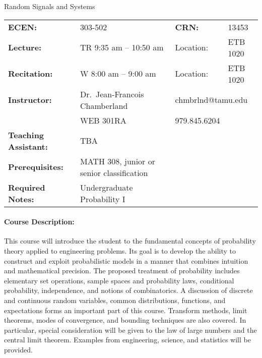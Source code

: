 \documentclass{article}
\begin{document}
\begin{center}
{\LARGE \sc Random Signals and Systems \\[5mm]}
\end{center}

\begin{center}
\begin{tabular}{llll}
\textbf{ECEN:} & 303-502 & \textbf{CRN:} & 13453 \tabularnewline[1mm]
\textbf{Lecture:} & TR 9:35 am -- 10:50 am & {Location:} & ETB 1020\tabularnewline[1mm]
\textbf{Recitation:} & W 8:00 am -- 9:00 am & {Location:} & ETB 1020 \tabularnewline[1mm]
\textbf{Instructor:} & Dr.~Jean-Francois Chamberland & \multicolumn{2}{l}{chmbrlnd@tamu.edu} \tabularnewline[1mm]
& WEB 301RA & 979.845.6204 \tabularnewline[1mm]
\textbf{Teaching Assistant:} & TBA & & \tabularnewline[1mm]
\textbf{Prerequisites:} & {MATH 308, junior or senior classification} \tabularnewline[1mm]
\textbf{Required Notes:} & {Undergraduate Probability I} \tabularnewline[1mm]
\end{tabular}
\end{center}

\paragraph{Course Description:}
This course will introduce the student to the fundamental concepts of probability theory applied to engineering problems.
Its goal is to develop the ability to construct and exploit probabilistic models in a manner that combines intuition and mathematical precision.
The proposed treatment of probability includes elementary set operations, sample spaces and probability laws, conditional probability, independence, and notions of combinatorics.
A discussion of discrete and continuous random variables, common distributions, functions, and expectations forms an important part of this course.
Transform methods, limit theorems, modes of convergence, and bounding techniques are also covered.
In particular, special consideration will be given to the law of large numbers and the central limit theorem.
Examples from engineering, science, and statistics will be provided.


%
\end{document}
